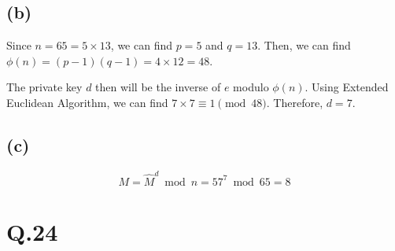 \documentclass[a4paper,12pt]{article}
\begin{document}
\subsection*{(b)}

Since $n = 65 = 5 \times 13$, we can find $p = 5$ and $q = 13$.
Then, we can find $\phi(n) = (p-1)(q-1) = 4 \times 12 = 48$.

The private key $d$ then will be the inverse of $e$ modulo $\phi(n)$.
Using Extended Euclidean Algorithm, we can find $7 \times 7 \equiv 1 \pmod{48}$.
Therefore, $d = 7$.

\subsection*{(c)}

\begin{equation*}
	M = \hat{M}^d \bmod n = 57^7 \bmod 65 = 8
\end{equation*}

\section*{Q.24}
\end{document}
